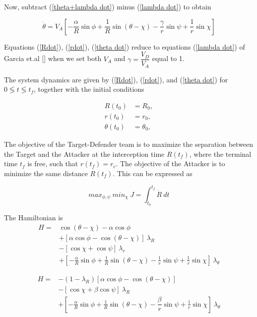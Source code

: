 Now, subtract (\ref{theta+lambda dot}) minus (\ref{lambda dot}) to obtain

\begin{equation}
\dot{\theta} = V_A [- \dfrac{\alpha}{R} \sin \phi + \dfrac{1}{R} \sin(\theta - \chi) - \dfrac{\gamma}{r} \sin \psi + \dfrac{1}{r}\sin \chi]
\label{theta dot}
\end{equation} 

Equations (\ref{Rdot}), (\ref{rdot}), (\ref{theta dot}) reduce to equations (\ref{lambda dot}) of Garcia et.al [] when we set both $V_A$ and $\gamma=\dfrac{V_D}{V_A}$ equal to 1. 

The system dynamics are given by (\ref{Rdot}), (\ref{rdot}), and (\ref{theta dot}) for $0\lessgtr t \lessgtr t_f$, together with the initial conditions 

\begin{equation*}
	\begin{split}
		R(t_0)&=R_0,\\
		r(t_0)&= r_0,\\
		\theta(t_0)&=\theta_0,
	\end{split}
\end{equation*}

The objective of the Target-Defender team is to maximize
the separation between the Target and the Attacker at the
interception time $R(t_f)$, where the terminal time $t_f$ is free,
such that $r(t_f) = r_c$. The objective of the Attacker is to
minimize the same distance $R(t_f)$. This can be expressed as

\begin{equation*}
max_{\phi,\psi}\ min_\chi\ J= \int_{t_0}^{t_f} \dot{R}\ dt
\end{equation*}

The Hamiltonian is
\begin{equation}
	\begin{split}
	H = & \cos(\theta - \chi) - \alpha \cos \phi \\
	& + [\alpha \cos \phi  - \cos (\theta - \chi)]\ \lambda_R \\
	& - [\cos\chi + \cos\psi]\ \lambda_r \\
	& + [-\frac{\alpha}{R}\sin\phi 
	+\frac{1}{R}\sin(\theta - \chi )
	-\frac{1}{r} \sin \psi
	+\frac{1}{r} \sin \chi]\ \lambda_\theta
	\end{split}
	\label{Hamiltonian}
\end{equation}


\begin{equation*}
	\begin{split}
		H = & -(1-\lambda_R) [\alpha \cos \phi - \cos(\theta - \chi)]\\
		& - [\cos\chi + \beta \cos \psi ]\ \lambda_R \\
		& + [-\frac{\alpha}{R} \sin \phi + \frac{1}{R} \sin (\theta - \chi) - \dfrac{\beta}{r} \sin \psi + \frac{1}{r} \sin \chi ]\ \lambda_\theta 
	\end{split}
\end{equation*}

